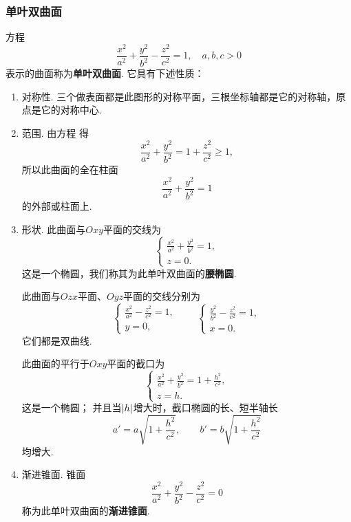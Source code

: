 \subsubsection{单叶双曲面}
方程\begin{equation}\label{equation:解析几何.单叶双曲面}
	\frac{x^2}{a^2}+\frac{y^2}{b^2}-\frac{z^2}{c^2}=1,
	\quad a,b,c>0
\end{equation}
表示的曲面称为\textbf{单叶双曲面}.
它具有下述性质：
\begin{enumerate}
	\item 对称性.
	三个做表面都是此图形的对称平面，三根坐标轴都是它的对称轴，原点是它的对称中心.

	\item 范围.
	由方程  得\[
		\frac{x^2}{a^2}+\frac{y^2}{b^2}=1+\frac{z^2}{c^2}\geqslant1,
	\]
	所以此曲面的全在柱面\[
		\frac{x^2}{a^2}+\frac{y^2}{b^2}=1
	\]的外部或柱面上.

	\item 形状.
	此曲面与\(Oxy\)平面的交线为\[
		\left\{ \begin{array}{l}
			\frac{x^2}{a^2}+\frac{y^2}{b^2}=1, \\
			z = 0.
		\end{array} \right.
	\]
	这是一个椭圆，我们称其为此单叶双曲面的\textbf{腰椭圆}.

	此曲面与\(Ozx\)平面、\(Oyz\)平面的交线分别为\[
		\left\{ \begin{array}{l}
			\frac{x^2}{a^2}-\frac{z^2}{c^2}=1, \\
			y = 0,
		\end{array} \right.
		\qquad
		\left\{ \begin{array}{l}
			\frac{y^2}{b^2}-\frac{z^2}{c^2}=1, \\
			x = 0.
		\end{array} \right.
	\]
	它们都是双曲线.

	此曲面的平行于\(Oxy\)平面的截口为\[
		\left\{ \begin{array}{l}
			\frac{x^2}{a^2}+\frac{y^2}{b^2}=1+\frac{h^2}{c^2}, \\
			z = h.
		\end{array} \right.
	\]
	这是一个椭圆；
	并且当\(\abs{h}\)增大时，截口椭圆的长、短半轴长\[
		a' = a \sqrt{1+\frac{h^2}{c^2}}, \qquad
		b' = b \sqrt{1+\frac{h^2}{c^2}}
	\]均增大.

	\item 渐进锥面.
	锥面\begin{equation}
		\frac{x^2}{a^2}+\frac{y^2}{b^2}-\frac{z^2}{c^2}=0
	\end{equation}
	称为此单叶双曲面的\textbf{渐进锥面}.


\end{enumerate}
